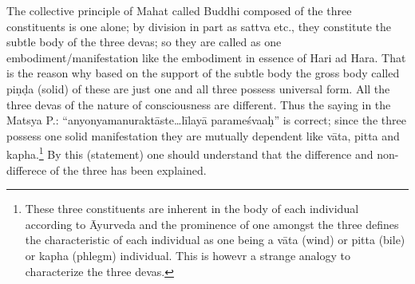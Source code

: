 The collective principle of Mahat called Buddhi composed of the three constituents is one alone; by division in part as sattva etc., they constitute the subtle body of the three devas; so they are called as one embodiment/manifestation like the embodiment in essence of Hari ad Hara. That is the reason why based on the support of the subtle body the gross body called piṇḍa (solid) of these are just one and all three possess universal form. All the three devas of the nature of consciousness are different. Thus the saying in the Matsya P.: “anyonyamanuraktāste…līlayā parameśvaaḥ” is correct; since the three possess one solid manifestation they are mutually dependent like vāta, pitta and kapha.\footnote{These three constituents are inherent in the body of each individual according to Āyurveda and the prominence of one amongst the three defines the characteristic of each individual as one being a vāta (wind) or pitta (bile) or kapha (phlegm) individual. This is howevr a strange analogy to characterize the three devas.} By this (statement) one should understand that the difference and non-differece of the three has been explained.


